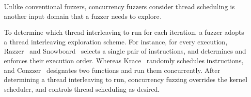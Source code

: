 










 
%
Unlike conventional fuzzers, concurrency fuzzers consider thread
scheduling is another input domain that a fuzzer needs to explore.
%

To determine which thread interleaving to run for each iteration, a
fuzzer adopts a thread interleaving exploration scheme.
%
For instance, for every execution, Razzer~\cite{razzer} and
Snowboard~\cite{snowboard} selects a single pair of instructions, and
determines and enforces their execution order.
%
Whereas Krace~\cite{krace} randomly schedules instructions, and
Conzzer~\cite{conzzer} designates two functions and run them
concurrently.
%
After determining a thread interleaving to run, concurrency fuzzing
overrides the kernel scheduler, and controls thread scheduling as
desired.



